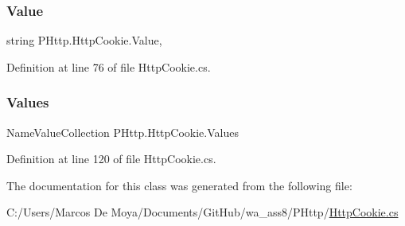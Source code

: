 \subsubsection{\texorpdfstring{Value}{Value}}
{\footnotesize\ttfamily string P\+Http.\+Http\+Cookie.\+Value\hspace{0.3cm}{\ttfamily [get]}, {\ttfamily [set]}}



Definition at line 76 of file Http\+Cookie.\+cs.

\mbox{\label{class_p_http_1_1_http_cookie_a0fba6732ef9272cc5785ed55589b3134}} 
\subsubsection{\texorpdfstring{Values}{Values}}
{\footnotesize\ttfamily Name\+Value\+Collection P\+Http.\+Http\+Cookie.\+Values\hspace{0.3cm}{\ttfamily [get]}}



Definition at line 120 of file Http\+Cookie.\+cs.



The documentation for this class was generated from the following file\+:\begin{DoxyCompactItemize}
\item 
C\+:/\+Users/\+Marcos De Moya/\+Documents/\+Git\+Hub/wa\+\_\+ass8/\+P\+Http/\hyperlink{_http_cookie_8cs}{Http\+Cookie.\+cs}\end{DoxyCompactItemize}
